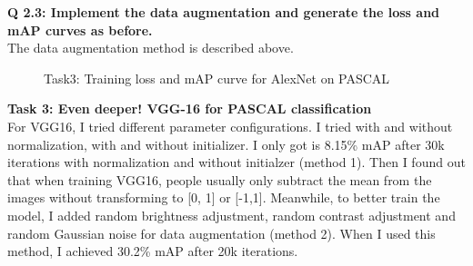 \documentclass[12pt]{report}
\begin{document}
\begin{outline}
\textbf{Q 2.3: Implement the data augmentation and generate the loss and mAP curves as before.}\\
The data augmentation method is described above.\\ 

\begin{figure}[!h]
  \centering
  \caption{Task3: Training loss and mAP curve for AlexNet on PASCAL}
\label{fig:short}
\end{figure}

\item \textbf{Task 3: Even deeper! VGG-16 for PASCAL classification}\\

For VGG16, I tried different parameter configurations. I tried with and without normalization, with and without initializer. I only got is 8.15\% mAP after 30k iterations with normalization and without initialzer (method 1). Then I found out that when training VGG16, people usually only subtract the mean from the images without transforming to [0, 1] or [-1,1]. Meanwhile, to better train the model, I added random brightness adjustment, random contrast adjustment and random Gaussian noise for data augmentation (method 2). When I used this method, I achieved 30.2\% mAP after 20k iterations. \\


\end{outline}
\end{document}
